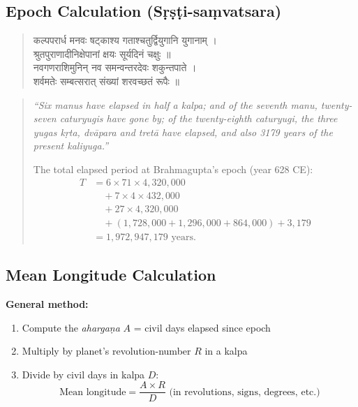 \documentclass[11pt,a4paper]{article}
\newcommand{\dev}[1]{{\devanagarifont #1}}
\theoremstyle{definition}
\begin{document}
\subsection*{Epoch Calculation (S\d{r}\d{s}\d{t}i-sa\d{m}vatsara)}



\noindent
\begin{quote}
\dev{कल्पपरार्ध मनवः षट्काश्य गताश्चतुर्द्वियुगानि युगानाम् ।\\
श्रुतपुराणादीनिक्षेपानां क्षयः सूर्यदिनं चक्षुः ॥}\\[0.3cm]
\dev{नवगणराशिमुनिन् नव समन्वन्तरदेवः शकुन्तपाते ।\\
शर्वमतेः सम्बत्सरात् संख्यां शरवच्छतं रूपैः ॥}
\end{quote}

\hfill\noindent
\begin{quote}
\textit{``Six manus have elapsed in half a kalpa; and of the seventh manu, twenty-seven caturyugis have gone by; of the twenty-eighth caturyugi, the three yugas k\d{r}ta, dv\=apara and tret\=a have elapsed, and also 3179 years of the present kaliyuga.''}

The total elapsed period at Brahmagupta's epoch (year 628 CE):
\begin{align*}
T &= 6 \times 71 \times 4{,}320{,}000 \\
  &\quad + 7 \times 4 \times 432{,}000 \\
  &\quad + 27 \times 4{,}320{,}000 \\
  &\quad + (1{,}728{,}000 + 1{,}296{,}000 + 864{,}000) + 3{,}179 \\
  &= 1{,}972{,}947{,}179 \text{ years.}
\end{align*}
\end{quote}



\subsection*{Mean Longitude Calculation}

\textbf{General method:}
\begin{enumerate}
  \item Compute the \textit{aharga\d{n}a} $A$ = civil days elapsed since epoch
  \item Multiply by planet's revolution-number $R$ in a kalpa
  \item Divide by civil days in kalpa $D$:
  \[
  \text{Mean longitude} = \frac{A \times R}{D} \text{ (in revolutions, signs, degrees, etc.)}
  \]
\end{enumerate}
\end{document}
